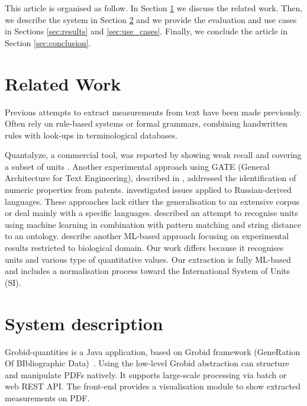 \documentclass[sigplan, anonymous, review]{acmart}
\begin{document}
This article is organised as follow. In Section \ref{sec:related_work} we discuss the related work. Then, we describe the system in Section \ref{sec:system} and we provide the evaluation and use cases in Sections \ref{sec:results} and  \ref{sec:use_cases}. Finally, we conclude the article in Section \ref{sec:conclusion}.

\section{Related Work}
\label{sec:related_work}
Previous attempts to extract measurements from text have been made previously. Often rely on rule-based systems or formal grammars, combining handwritten rules with look-ups in terminological databases.  

Quantalyze, a commercial tool, was reported by  \cite{hundman2017measurement} showing weak recall and covering a subset of units \cite{aras2014applications}. Another experimental approach using GATE (General Architecture for Text Engineering), described in \cite{agatonovic2008large}, addressed the identification of numeric properties from patents. \cite{am2013processing} investigated issues applied to Russian-derived languages. These approaches lack either the generalisation to an extensive corpus or deal mainly with a specific languages. \cite{berrahou2013extract} described an attempt to recognise units using machine learning in combination with pattern matching and string distance to an ontology. \cite{kang_extracting_2013} describe another ML-based approach focusing on experimental results restricted to biological domain. Our work differs because it recognises units and various type of quantitative values. Our extraction is fully ML-based and includes a normalisation process toward the International System of Units (SI). 

\section{System description}
\label{sec:system}
Grobid-quantities is a Java application, based on Grobid framework (GeneRation Of BIbliographic Data)~\cite{GROBID}. Using the low-level Grobid abstraction can structure and manipulate PDFs natively. It supports large-scale processing via batch or web REST API. The front-end provides a visualisation module to show extracted measurements on PDF.
\end{document}
